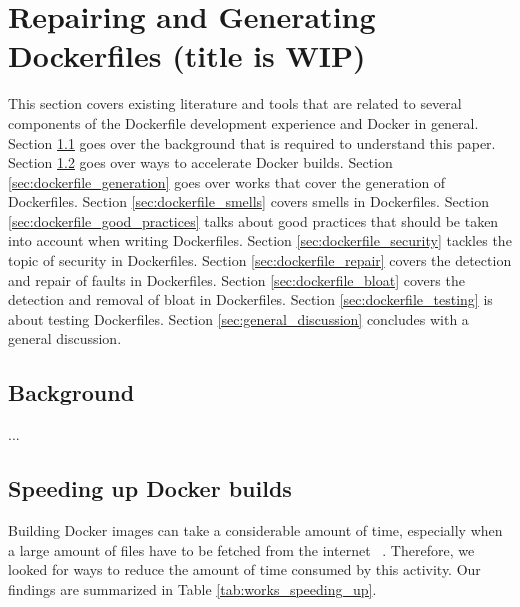 \chapter{Repairing and Generating Dockerfiles (title is WIP)} \label{chap:sota}

This section covers existing literature and tools that are related to several components of the Dockerfile development experience and Docker in general. Section \ref{sec:background} goes over the background that is required to understand this paper. Section \ref{sec:speeding_up_docker_builds} goes over ways to accelerate Docker builds. Section \ref{sec:dockerfile_generation} goes over works that cover the generation of Dockerfiles. Section \ref{sec:dockerfile_smells} covers smells in Dockerfiles. Section \ref{sec:dockerfile_good_practices} talks about good practices that should be taken into account when writing Dockerfiles. Section \ref{sec:dockerfile_security} tackles the topic of security in Dockerfiles. Section \ref{sec:dockerfile_repair} covers the detection and repair of faults in Dockerfiles. Section \ref{sec:dockerfile_bloat} covers the detection and removal of bloat in Dockerfiles. Section \ref{sec:dockerfile_testing} is about testing Dockerfiles. Section \ref{sec:general_discussion} concludes with a general discussion.

\section{Background} \label{sec:background}
...
\section{Speeding up Docker builds} \label{sec:speeding_up_docker_builds}

Building Docker images can take a considerable amount of time, especially when a large amount of files have to be fetched from the internet ~\citep{harterSlackerFastDistribution}. Therefore, we looked for ways to reduce the amount of time consumed by this activity. Our findings are summarized in Table \ref{tab:works_speeding_up}.


